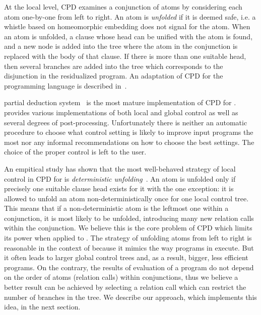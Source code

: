 At the local level, CPD examines a conjunction of atoms by considering each atom one-by-one from left to right.
An atom is \emph{unfolded} if it is deemed safe, i.e. a whistle based on homeomorphic embedding does not signal for the atom.
When an atom is unfolded, a clause whose head can be unified with the atom is found, and a new node is added into the tree where the atom in the conjunction is replaced with the body of that clause.
If there is more than one suitable head, then several branches are added into the tree which corresponds to the disjunction in the residualized program.
An adaptation of CPD for the \mk programming language is described in~\cite{lozov2019relational}.

\ecce partial deduction system~\cite{leuschel1997ecce} is the most mature implementation of CPD for \pro.
\ecce provides various implementations of both local and global control as well as several degrees of post-processing.
Unfortunately there is neither an automatic procedure to choose what control setting is likely to improve input programs the most nor any informal recommendations on how to choose the best settings.
The choice of the proper control is left to the user.

An empitical study has shown that the most well-behaved strategy of local control in CPD for \pro is \emph{deterministic unfolding}~\cite{leuschel1997advanced}.
An atom is unfolded only if precisely one suitable clause head exists for it with the one exception: it is allowed to unfold an atom non-deterministically once for one local control tree.
This means that if a non-deterministic atom is the leftmost one within a conjunction, it is most likely to be unfolded, introducing many new relation calls within the conjunction.
We believe this is the core problem of CPD which limits its power when applied to \mk.
The strategy of unfolding atoms from left to right is reasonable in the context of \pro because it mimics the way programs in \pro execute.
But it often leads to larger global control trees and, as a result, bigger, less efficient programs.
On the contrary, the results of evaluation of a \mk program do not depend on the order of atoms (relation calls) within conjunctions, thus we believe a better result can be achieved by selecting a relation call which can restrict the number of branches in the tree.
We describe our approach, which implements this idea, in the next section.
